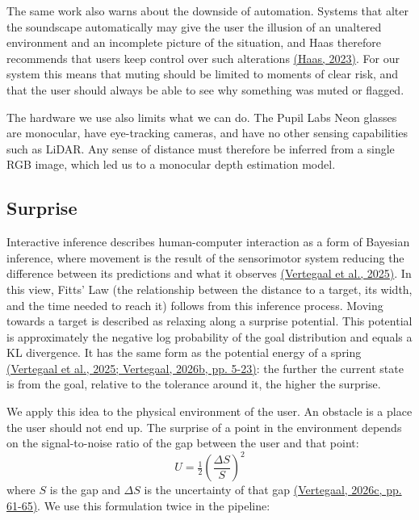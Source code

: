 \documentclass[a4paper]{article}
\begin{document}
The same work also warns about the downside of automation. Systems that alter the soundscape automatically may give the user the illusion of an unaltered environment and an incomplete picture of the situation, and Haas therefore recommends that users keep control over such alterations \hyperref[references]{(Haas, 2023)}. For our system this means that muting should be limited to moments of clear risk, and that the user should always be able to see why something was muted or flagged.

The hardware we use also limits what we can do. The Pupil Labs Neon glasses are monocular, have eye-tracking cameras, and have no other sensing capabilities such as LiDAR. Any sense of distance must therefore be inferred from a single RGB image, which led us to a monocular depth estimation model.
\subsection{Surprise} \label{surprise}

Interactive inference describes human-computer interaction as a form of Bayesian inference, where movement is the result of the sensorimotor system reducing the difference between its predictions and what it observes \hyperref[references]{(Vertegaal et al., 2025)}. In this view, Fitts' Law (the relationship between the distance to a target, its width, and the time needed to reach it) follows from this inference process. Moving towards a target is described as relaxing along a surprise potential. This potential is approximately the negative log probability of the goal distribution and equals a KL divergence. It has the same form as the potential energy of a spring \hyperref[references]{(Vertegaal et al., 2025; Vertegaal, 2026b, pp. 5-23)}: the further the current state is from the goal, relative to the tolerance around it, the higher the surprise.

We apply this idea to the physical environment of the user. An obstacle is a place the user should not end up. The surprise of a point in the environment depends on the signal-to-noise ratio of the gap between the user and that point:
$$U = \tfrac12 \left(\frac{\Delta S}{S}\right)^2$$
where $S$ is the gap and $\Delta S$ is the uncertainty of that gap \hyperref[references]{(Vertegaal, 2026c, pp. 61-65)}. We use this formulation twice in the pipeline:
\end{document}

